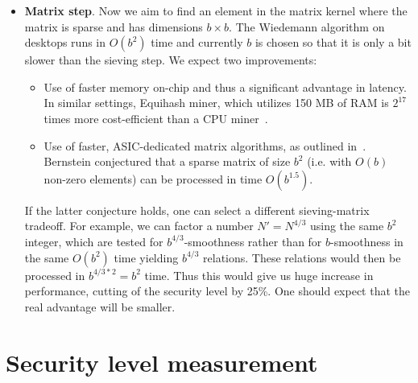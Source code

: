 \documentclass[a4paper]{article}
\begin{document}
\begin{itemize}
     \item \textbf{Matrix step}. Now we aim to find an element in the matrix kernel where the matrix is sparse and has dimensions $b\times b$. The Wiedemann algorithm on desktops runs in $O(b^2)$ time and currently  $b$ is chosen so that it is only a bit slower than the sieving step. We expect two improvements: 
     \begin{itemize}
         \item Use of faster memory on-chip and thus a significant advantage in latency. In similar settings, Equihash miner, which utilizes 150 MB of RAM is $2^{17}$ times more cost-efficient than a CPU miner~\cite{equihashminer}.
         \item Use of faster, ASIC-dedicated matrix algorithms, as outlined in~\cite{bernstein01}. Bernstein conjectured that a sparse matrix of size $b^2$ (i.e. with $O(b)$ non-zero elements) can be processed in time $O(b^{1.5})$.
     \end{itemize}
     If  the latter conjecture holds, one can select a different sieving-matrix tradeoff. For example, we can factor a number $N'=N^{4/3}$ using the same $b^2$ integer, which are  tested for $b^{4/3}$-smoothness rather than for $b$-smoothness in the same $O(b^2)$ time yielding $b^{4/3}$ relations. These relations would then be processed in $b^{4/3*2} = b^2$ time. Thus this would give us huge increase in performance, cutting of the security level by 25\%. One should expect that the real advantage will be smaller.
      
 \end{itemize}
 
\section{Security level measurement}\label{sec:measure}
\end{document}

